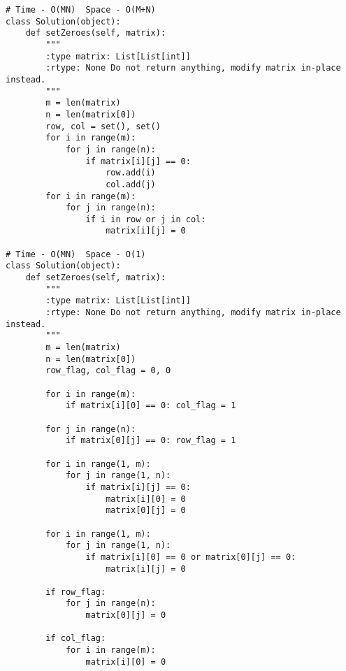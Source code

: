 \begin{lstlisting}
# Time - O(MN)  Space - O(M+N)
class Solution(object):
    def setZeroes(self, matrix):
        """
        :type matrix: List[List[int]]
        :rtype: None Do not return anything, modify matrix in-place instead.
        """
        m = len(matrix)
        n = len(matrix[0])
        row, col = set(), set()
        for i in range(m):
            for j in range(n):
                if matrix[i][j] == 0:
                    row.add(i)
                    col.add(j)   
        for i in range(m):
            for j in range(n):
                if i in row or j in col:
                    matrix[i][j] = 0
            
# Time - O(MN)  Space - O(1)
class Solution(object):
    def setZeroes(self, matrix):
        """
        :type matrix: List[List[int]]
        :rtype: None Do not return anything, modify matrix in-place instead.
        """
        m = len(matrix)
        n = len(matrix[0])
        row_flag, col_flag = 0, 0
        
        for i in range(m):
            if matrix[i][0] == 0: col_flag = 1
        
        for j in range(n):
            if matrix[0][j] == 0: row_flag = 1
        
        for i in range(1, m):
            for j in range(1, n):
                if matrix[i][j] == 0:
                    matrix[i][0] = 0
                    matrix[0][j] = 0
        
        for i in range(1, m):
            for j in range(1, n):
                if matrix[i][0] == 0 or matrix[0][j] == 0:
                    matrix[i][j] = 0
                    
        if row_flag:
            for j in range(n):
                matrix[0][j] = 0
                
        if col_flag:
            for i in range(m):
                matrix[i][0] = 0                
\end{lstlisting}

